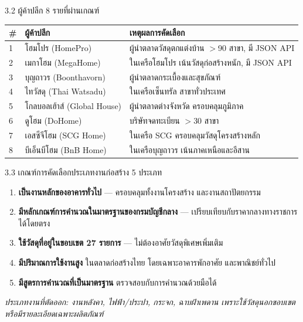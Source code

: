 \documentclass[aspectratio=169,11pt]{beamer}
\begin{document}
\begin{frame}{3.2 ผู้ค้าปลีก 8 รายที่ผ่านเกณฑ์}
  \footnotesize
  \begin{table}
    \centering
    \begin{tabularx}{\textwidth}{l l X}
      \toprule
      \textbf{\#} & \textbf{ผู้ค้าปลีก} & \textbf{เหตุผลการคัดเลือก} \\
      \midrule
      1 & โฮมโปร (HomePro)        & ผู้นำตลาดวัสดุตกแต่งบ้าน $>$90 สาขา, มี JSON API \\
      2 & เมกาโฮม (MegaHome)      & ในเครือโฮมโปร เน้นวัสดุก่อสร้างหนัก, มี JSON API \\
      3 & บุญถาวร (Boonthavorn)   & ผู้นำตลาดกระเบื้องและสุขภัณฑ์ \\
      4 & ไทวัสดุ (Thai Watsadu)  & ในเครือเซ็นทรัล สาขาทั่วประเทศ \\
      5 & โกลบอลเฮ้าส์ (Global House) & ผู้นำตลาดต่างจังหวัด ครอบคลุมภูมิภาค \\
      6 & ดูโฮม (DoHome)          & บริษัทจดทะเบียน $>$30 สาขา \\
      7 & เอสซีจีโฮม (SCG Home)   & ในเครือ SCG ครอบคลุมวัสดุโครงสร้างหลัก \\
      8 & บีเอ็นบีโฮม (BnB Home)  & ในเครือบุญถาวร เน้นภาคเหนือและอีสาน \\
      \bottomrule
    \end{tabularx}
  \end{table}
\end{frame}

\begin{frame}{3.3 เกณฑ์การคัดเลือกประเภทงานก่อสร้าง 5 ประเภท}
  \begin{enumerate}
    \item \textbf{เป็นงานหลักของอาคารทั่วไป} --- ครอบคลุมทั้งงานโครงสร้าง
          และงานสถาปัตยกรรม
    \item \textbf{มีหลักเกณฑ์การคำนวณในมาตรฐานของกรมบัญชีกลาง} ---
          เปรียบเทียบกับราคากลางทางราชการได้โดยตรง
    \item \textbf{ใช้วัสดุที่อยู่ในขอบเขต 27 รายการ} --- ไม่ต้องอาศัยวัสดุพิเศษเพิ่มเติม
    \item \textbf{มีปริมาณการใช้งานสูง} ในตลาดก่อสร้างไทย โดยเฉพาะอาคารพักอาศัย
          และพาณิชย์ทั่วไป
    \item \textbf{มีสูตรการคำนวณที่เป็นมาตรฐาน} ตรวจสอบกับการคำนวณด้วยมือได้
  \end{enumerate}
  \vspace{0.3em}
  \footnotesize\emph{ประเภทงานที่ตัดออก: งานหลังคา, ไฟฟ้า/ประปา, กระจก, ฉาบฝ้าเพดาน
  เพราะใช้วัสดุนอกขอบเขต หรือมีรายละเอียดเฉพาะผลิตภัณฑ์}
\end{frame}
\end{document}

